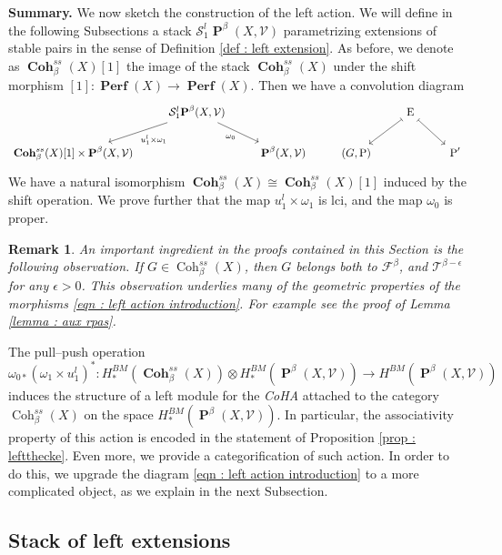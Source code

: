 \documentclass[11pt]{article}
\newtheorem{remark}[theorem]{Remark}
\newcommand{\segal}{\mathcal{S}}
\newcommand{\fbeta}{\mathcal{F}^{\beta}}
\newcommand{\cohbetass}{\operatorname{Coh}^{ss}_{\beta}(X)}
\newcommand{\perfstack}{\boldsymbol{\operatorname{Perf}}(X)}
\newcommand{\cohbetassstack}{\boldsymbol{\operatorname{Coh}}^{ss}_{\beta}(X)}
\newcommand{\pairs}{\boldsymbol{\operatorname{P}}^{\beta}(X,\mathcal{V})}
\begin{document}
\noindent\textbf{Summary. }We now sketch the construction of the left action. We will define in the following Subsections a stack $\segal^l_1\pairs$ parametrizing extensions of stable pairs in the sense of Definition \ref{def : left extension}. As before, we denote as $\cohbetassstack[1]$ the image of the stack $\cohbetassstack$ under the shift morphism $[1] \colon \perfstack \rightarrow \perfstack$. Then we have a convolution diagram
\begin{equation}\label{eqn : left action introduction}
\begin{tikzcd}
	& {\segal_1^l\pairs} &&& {\operatorname{E}} \\
	{\cohbetassstack[1] \times \pairs} && \pairs & {(G,\operatorname{P})} && {\operatorname{P}'}
	\arrow["{u^l_1 \times \omega_1}", from=1-2, to=2-1]
	\arrow["{\omega_0}"', from=1-2, to=2-3]
	\arrow[maps to, from=1-5, to=2-4]
	\arrow[maps to, from=1-5, to=2-6]
\end{tikzcd}
\end{equation}
We have a natural isomorphism $\cohbetassstack \cong \cohbetassstack[1]$ induced by the shift operation. We prove further that the map $u^l_1 \times \omega_1$ is lci, and the map $\omega_0$ is proper. 
 \begin{remark}\label{rmk : coh ss and topology}
      An important ingredient in the proofs contained in this Section is the following observation. If $G\in \cohbetass$, then $G$ belongs both to $\fbeta$, and $\mathcal{T}^{\beta-\epsilon}$ for any $\epsilon >0$. This observation underlies many of the geometric properties of the morphisms \eqref{eqn : left action introduction}. For example see the proof of Lemma \ref{lemma : aux rpas}. 
 \end{remark}
\noindent The pull--push operation
\[
    \omega_{0*}(\omega_1 \times u^l_1)^* \colon H^{BM}_*(\cohbetassstack)\otimes H^{BM}_*(\pairs) \longrightarrow H^{BM}(\pairs)
\]
induces the structure of a left module for the \textit{CoHA} attached to the category $\cohbetass$ on the space $H^{BM}_*(\pairs)$. In particular, the associativity property of this action is encoded in the statement of Proposition \ref{prop : leftthecke}. Even more, we provide a categorification of such action. In order to do this, we upgrade the diagram \eqref{eqn : left action introduction} to a more complicated object, as we explain in the next Subsection. 


  \subsection{Stack of left extensions}
\end{document}
